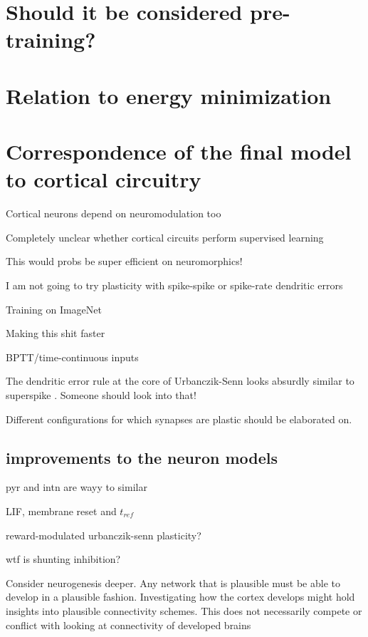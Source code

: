 \section{Should it be considered pre-training?}


\section{Relation to energy minimization}


\section{Correspondence of the final model to cortical circuitry}

Cortical neurons depend on neuromodulation too \cite{Roelfsema2018}

Completely unclear whether cortical circuits perform supervised learning \citep{magee2020synaptic}


This would probs be super efficient on neuromorphics!

I am not going to try plasticity with spike-spike or spike-rate dendritic errors

Training on ImageNet

Making this shit faster

BPTT/time-continuous inputs


The dendritic error rule at the core of Urbanczik-Senn looks absurdly similar to superspike \citep{Zenke2018}.
Someone should look into that!

Different configurations for which synapses are plastic should be elaborated on.


\subsection{improvements to the neuron models}



pyr and intn are wayy to similar

LIF, membrane reset and $t_{ref}$

reward-modulated urbanczik-senn plasticity?

wtf is shunting inhibition?

Consider neurogenesis deeper. Any network that is plausible must be able to develop in a plausible fashion. Investigating
how the cortex develops might hold insights into plausible connectivity schemes. This does not necessarily compete or
conflict with looking at connectivity of developed brains


